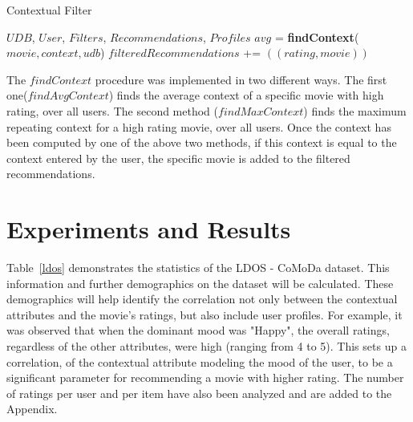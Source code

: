 \documentclass{article}
\begin{document}
\begin{algorithm}[tb]
   \caption{Contextual Filter}
   \label{Contextual Filtering of Collaborative Filtering results}
\begin{algorithmic}
    $UDB$, $User$, $Filters$, $Recommendations$, $Profiles$
   \STATE $avg$ = {\bfseries findContext}($movie, context, udb$)
   \STATE $filteredRecommendations$ += $((rating, movie))$
   \ENDIF   
   \ENDIF
   \ENDFOR
   \ENDIF
   \ENDFOR
\end{algorithmic}
\end{algorithm}

The $findContext$ procedure was implemented in two different ways. The first one($findAvgContext$) finds the average context of a specific movie with high rating, over all users. The second method ($findMaxContext$) finds the maximum repeating context for a high rating movie, over all users. Once the context has been computed by one of the above two methods, if this context is equal to the context entered by the user, the specific movie is added to the filtered recommendations.


\section{Experiments and Results}
Table~\ref{ldos} demonstrates the statistics of the LDOS - CoMoDa dataset. This information and further demographics on the dataset will be calculated. These demographics will help identify the correlation not only between the contextual attributes and the movie's ratings, but also include user profiles. For example, it was observed that when the dominant mood was "Happy", the overall ratings, regardless of the other attributes, were high (ranging from 4 to 5). This sets up a correlation, of the contextual attribute modeling the mood of the user, to be a significant parameter for recommending a movie with higher rating. The number of ratings per user and per item have also been analyzed and are added to the Appendix.
\end{document}
